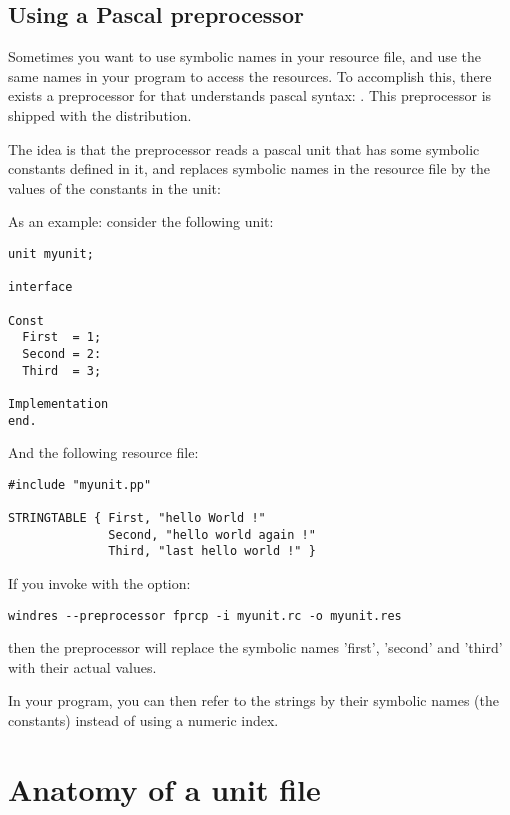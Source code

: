 \section{Using a Pascal preprocessor}

Sometimes you want to use symbolic names in your resource file, and
use the same names in your program to access the resources. To accomplish
this, there exists a preprocessor for  that understands pascal
syntax: . This preprocessor is shipped with the \fpc
distribution.

The idea is that the preprocessor reads a pascal unit that has some
symbolic constants defined in it, and replaces symbolic names in the
resource file by the values of the constants in the unit:

As an example: consider the following unit:
\begin{verbatim}
unit myunit;

interface

Const
  First  = 1;
  Second = 2:
  Third  = 3;

Implementation
end.
\end{verbatim}
And the following resource file:
\begin{verbatim}
#include "myunit.pp"

STRINGTABLE { First, "hello World !"
              Second, "hello world again !"
              Third, "last hello world !" }

\end{verbatim}
If you invoke  with the  option:
\begin{verbatim}
windres --preprocessor fprcp -i myunit.rc -o myunit.res
\end{verbatim}
then the preprocessor will replace the symbolic names 'first', 'second'
and 'third' with their actual values.

In your program, you can then refer to the strings by their symbolic
names (the constants) instead of using a numeric index.

\appendix


\chapter{Anatomy of a unit file}
\label{ch:AppA}

